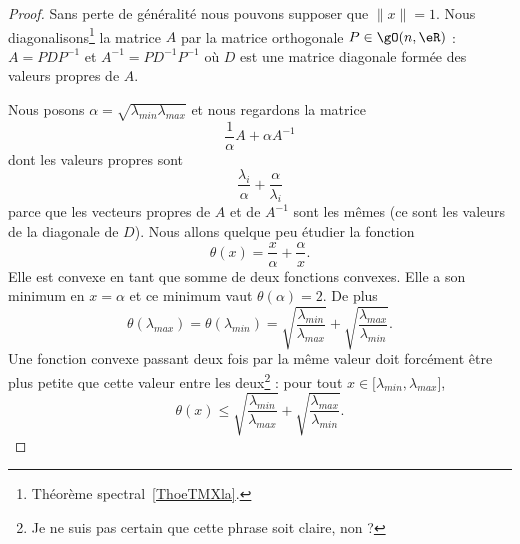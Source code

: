 \begin{proof}
    Sans perte de généralité nous pouvons supposer que \( \| x \|=1\). Nous diagonalisons\footnote{Théorème spectral~\ref{ThoeTMXla}.} la matrice \( A\) par la matrice orthogonale  \( P\in\gO(n,\eR)\) : \( A=PDP^{-1}\) et \( A^{-1}=PD^{-1}P^{-1}\) où \( D\) est  une matrice diagonale formée des valeurs propres de \( A\).

    Nous posons \( \alpha=\sqrt{\lambda_{min}\lambda_{max}}\) et nous regardons la matrice
    \begin{equation}
        \frac{1}{ \alpha }A+\alpha A^{-1}
    \end{equation}
    dont les valeurs propres sont
    \begin{equation}
        \frac{ \lambda_i }{ \alpha }+\frac{ \alpha }{ \lambda_i }
    \end{equation}
    parce que les vecteurs propres de \( A\) et de \( A^{-1}\) sont les mêmes (ce sont les valeurs de la diagonale de \( D\)). Nous allons quelque peu étudier la fonction
    \begin{equation}
        \theta(x)=\frac{ x }{ \alpha }+\frac{ \alpha }{ x }.
    \end{equation}
    Elle est convexe en tant que somme de deux fonctions convexes. Elle a son minimum en \( x=\alpha\) et ce minimum vaut \( \theta(\alpha)=2\). De plus
    \begin{equation}
        \theta(\lambda_{max})=\theta(\lambda_{min})=\sqrt{\frac{ \lambda_{min} }{ \lambda_{max} }}+\sqrt{\frac{ \lambda_{max} }{ \lambda_{min} }}.
    \end{equation}
    Une fonction convexe passant deux fois par la même valeur doit forcément être plus petite que cette valeur entre les deux\footnote{Je ne suis pas certain que cette phrase soit claire, non ?} : pour tout \( x\in\mathopen[ \lambda_{min} , \lambda_{max} \mathclose]\),
    \begin{equation}
        \theta(x)\leq  \sqrt{\frac{ \lambda_{min} }{ \lambda_{max} }}+\sqrt{\frac{ \lambda_{max} }{ \lambda_{min} }}.
    \end{equation}


\end{proof}
